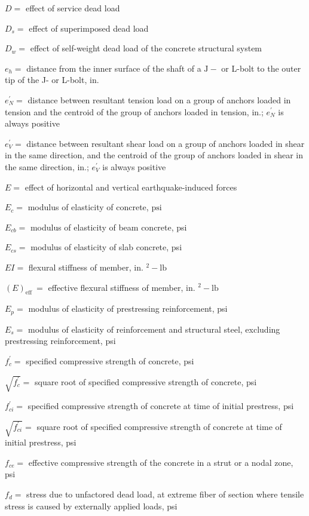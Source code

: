 \documentclass[10pt]{article}
\begin{document}
$D=$ effect of service dead load

$D_{s}=$ effect of superimposed dead load

$D_{w}=$ effect of self-weight dead load of the concrete structural system

$e_{h}=$ distance from the inner surface of the shaft of a $\mathrm{J}-$ or L-bolt to the outer tip of the J- or L-bolt, in.

$e_{N}^{\prime}=$ distance between resultant tension load on a group of anchors loaded in tension and the centroid of the group of anchors loaded in tension, in.; $e_{N}^{\prime}$ is always positive

$e_{V}^{\prime}=$ distance between resultant shear load on a group of anchors loaded in shear in the same direction, and the centroid of the group of anchors loaded in shear in the same direction, in.; $e_{V}^{\prime}$ is always positive

$E=$ effect of horizontal and vertical earthquake-induced forces

$E_{c}=$ modulus of elasticity of concrete, $\mathrm{psi}$

$E_{c b}=$ modulus of elasticity of beam concrete, psi

$E_{c s}=$ modulus of elasticity of slab concrete, psi

$E I=$ flexural stiffness of member, in. ${ }^{2}-\mathrm{lb}$

$(E)_{\text {eff }}=$ effective flexural stiffness of member, in. ${ }^{2}-\mathrm{lb}$

$E_{p}=$ modulus of elasticity of prestressing reinforcement, psi

$E_{s}=$ modulus of elasticity of reinforcement and structural steel, excluding prestressing reinforcement, psi

$f_{c}^{\prime}=$ specified compressive strength of concrete, psi

$\sqrt{f_{c}^{\prime}}=$ square root of specified compressive strength of concrete, psi

$f_{c i}^{\prime}=$ specified compressive strength of concrete at time of initial prestress, psi

$\sqrt{f_{c i}^{\prime}}=$ square root of specified compressive strength of concrete at time of initial prestress, psi

$f_{c e}=$ effective compressive strength of the concrete in a strut or a nodal zone, psi

$f_{d}=$ stress due to unfactored dead load, at extreme fiber of section where tensile stress is caused by externally applied loads, psi
\end{document}
